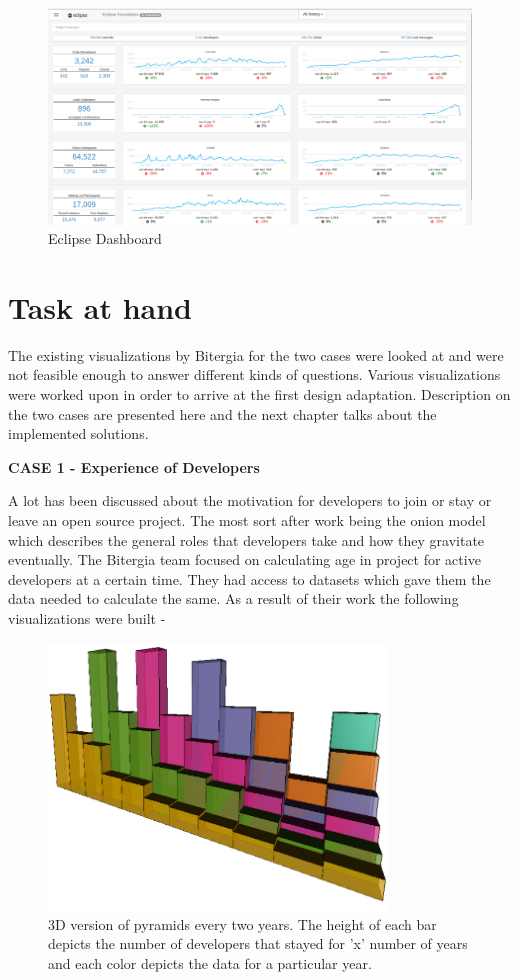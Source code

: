 \documentclass[seploa]{beavtex}
\begin{document}
\begin{figure}[H]
\centering
\includegraphics[width=120mm]{eclipse.png}
\caption{Eclipse Dashboard}
\end{figure}

\section{Task at hand}
The existing visualizations by Bitergia for the two cases were looked at and were not feasible enough to answer different kinds of questions. Various visualizations were worked upon in order to arrive at the first design adaptation. Description on the two cases are presented here and the next chapter talks about the implemented solutions.

\textbf{CASE 1 - Experience of Developers}

A lot has been discussed about the motivation for developers to join or stay or leave an open source project. The most sort after work being the onion model which describes the general roles that developers take and how they gravitate eventually\cite{crowston2005,  kishida2003}. The Bitergia team focused on calculating age in project for active developers at a certain time. They had access to datasets which gave them the data needed to calculate the same. As a result of their work the following visualizations were built - 

\begin{figure}[!ht]
\centering
\includegraphics[width=90mm]{age2.png}
\caption{3D version of pyramids every two years. The height of each bar depicts the number of developers that stayed for 'x' number of years and each color depicts the data for a particular year.}
\end{figure}
\end{document}
